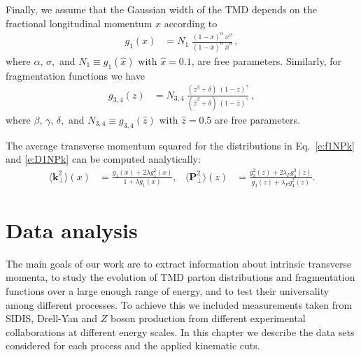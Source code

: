 \documentclass[aps,preprintnumbers,showpacs,nofootinbib,superscriptaddress,floatfix]{revtex4}
\begin{document}
Finally, we assume that the Gaussian width of the TMD depends on the 
fractional longitudinal momentum $x$ according to
\begin{align} 
 g_1 (x) &= N_1 \;  
\frac{(1-x)^{\alpha} \  x^{\sigma} }{ (1 - \hat{x})^{\alpha} \  \hat{x}^{\sigma} } \, ,
\label{e:kT2_kin}
\end{align}
where $\alpha, \, \sigma,$ and $N_1 \equiv  g_1 (\hat{x})$ with $\hat{x} = 0.1$,
are free parameters. Similarly, for fragmentation functions we have
\begin{align}  
g_{3,4} (z) &= N_{3,4} \  
               \frac{ (z^{\beta} + \delta)\ (1-z)^{\gamma} }{ (\hat{z}^{\beta} + \delta)\   (1 - \hat{z})^{\gamma} } \, ,
 \label{e:PT2_kin}
 \end{align}
where $\beta, \, \gamma, \, \delta, $ and $N_{3,4} \equiv g_{3,4} (\hat{z})$ with
$\hat{z} = 0.5$ 
are free parameters. 

The average transverse momentum squared for the distributions in
Eq.~\eqref{e:f1NPk} and \eqref{e:D1NPk} can be computed analytically:
\begin{align}
\big \langle \bm{k}_{\perp}^2 \big \rangle (x) &= \frac{g_1(x) + 2 \lambda g_1^2(x)}
{1+ \lambda g_1(x)},
&
\big \langle \bm{P}_{\perp}^2 \big \rangle (z) &= \frac{g_3^2(z) + 2 \lambda_F
  g_4^3(z)}{g_3(z) + \lambda_F g_4^2(z)}.
\label{e:transmom2}
\end{align} 

\section{Data analysis}
\label{s:data_analysis}


The main goals of our work are to extract information about intrinsic transverse momenta, to study the evolution of TMD parton distributions and fragmentation functions over a large enough range of energy, and to test their universality among different processes.
To achieve this we included measurements taken from SIDIS, Drell-Yan and $Z$
boson production from different experimental collaborations at different
energy scales. 
In this chapter we describe the data sets considered for each process and the applied kinematic cuts.
\end{document}
